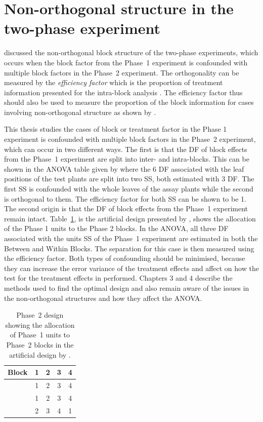 \documentclass[11pt,a4paper]{article}
\begin{document}
\section{Non-orthogonal structure in the two-phase experiment}
\cite{Wood1988} discussed the non-orthogonal block structure of the two-phase experiments, which occurs when the block factor from the Phase~1 experiment is confounded with multiple block factors in the Phase~2 experiment. The orthogonality can be measured by the \emph{efficiency factor} which is the proportion of treatment information presented for the intra-block analysis \citep{Yates1936}. The efficiency factor thus should also be used to measure the proportion of the block information for cases involving non-orthogonal structure as shown by \citep{Wood1988}. 

This thesis studies the cases of block or treatment factor in the Phase 1 experiment is confounded with multiple block factors in the Phase~2 experiment, which can occur in two different ways. The first is that the DF of block effects from the Phase~1 experiment are split into inter- and intra-blocks. This can be shown in the ANOVA table given by \cite{Curnow1959} where the 6 DF associated with the leaf positions of the test plants are split into two SS, both estimated with 3 DF. The first SS is confounded with the whole leaves of the assay plants while the second is orthogonal to them. The efficiency factor for both SS can be shown to be 1. The second origin is that the DF of block effects from the Phase~1 experiment remain intact. Table~\ref{tab:Wood1988}, is the artificial design presented by \cite{Wood1988}, shows the allocation of the Phase 1 units to the Phase 2 blocks. In the ANOVA, all three DF associated with the units SS of the Phase~1 experiment are estimated in both the Between and Within Blocks. The separation for this case is then measured using the efficiency factor. Both types of confounding should be minimised, because they can increase the error variance of the treatment effects and affect on how the test for the treatment effects in performed. Chapters 3 and 4 describe the methods used to find the optimal design and also remain aware of the issues in the non-orthogonal structures and how they affect the ANOVA. 

\begin{table}[ht]
\centering
\caption{Phase~2 design showing the allocation of Phase~1 units to Phase~2 blocks in the artificial design by \cite{Wood1988}.}
\begin{tabular}{ccccc} 
\bf Block & 1 & 2 & 3 & 4 \\ \hline
& 1 & 2 & 3 & 4 \\  
& 1 & 2 & 3 & 4 \\  
& 2 & 3 & 4 & 1 \\   \hline
\end{tabular} 
\label{tab:Wood1988}
\end{table}
\end{document}

